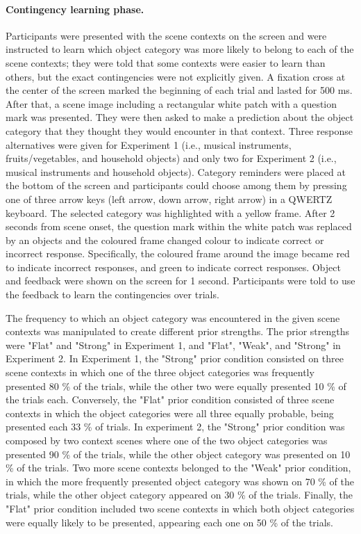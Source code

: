 \documentclass[a4paper,12pt]{article} 			%
\begin{document}
\paragraph{Contingency learning phase.}
Participants were presented with the scene contexts on the screen and were instructed to learn which object category was more likely to belong to each of the scene contexts; they were told that some contexts were easier to learn than others, but the exact contingencies were not explicitly given. A fixation cross at the center of the screen marked the beginning of each trial and lasted for 500 ms. After that, a scene image including a rectangular white patch with a question mark was presented. They were then asked to make a prediction about the object category that they thought they would encounter in that context. Three response alternatives were given for Experiment 1 (i.e., musical instruments, fruits/vegetables, and household objects) and only two for Experiment 2 (i.e., musical instruments and household objects). Category reminders were placed at the bottom of the screen and participants could choose among them by pressing one of three arrow keys (left arrow, down arrow, right arrow) in a QWERTZ keyboard. The selected category was highlighted with a yellow frame. After 2 seconds from scene onset, the question mark within the white patch was replaced by an objects and the coloured frame changed colour to indicate correct or incorrect response. Specifically, the coloured frame around the image became red to indicate incorrect responses, and green to indicate correct responses. Object and feedback were shown on the screen for 1 second. Participants were told to use the feedback to learn the contingencies over trials. \par
The frequency to which an object category was encountered in the given scene contexts was manipulated to create different prior strengths. The prior strengths were "Flat" and "Strong" in Experiment 1, and "Flat", "Weak", and "Strong" in Experiment 2. In Experiment 1, the "Strong" prior condition consisted on three scene contexts in which one of the three object categories was frequently presented 80 \% of the trials, while the other two were equally presented 10 \% of the trials each. Conversely, the "Flat" prior condition consisted of three scene contexts in which the object categories were all three equally probable, being presented each 33 \% of trials. 
In experiment 2, the "Strong" prior condition was composed by two context scenes where one of the two object categories was presented 90 \% of the trials, while the other object category was presented on 10 \% of the trials. Two more scene contexts belonged to the "Weak" prior condition, in which the more frequently presented object category was shown on 70 \% of the trials, while the other object category appeared on 30 \% of the trials. Finally, the "Flat" prior condition included two scene contexts in which both object categories were equally likely to be presented, appearing each one on 50 \% of the trials. 
\end{document}
